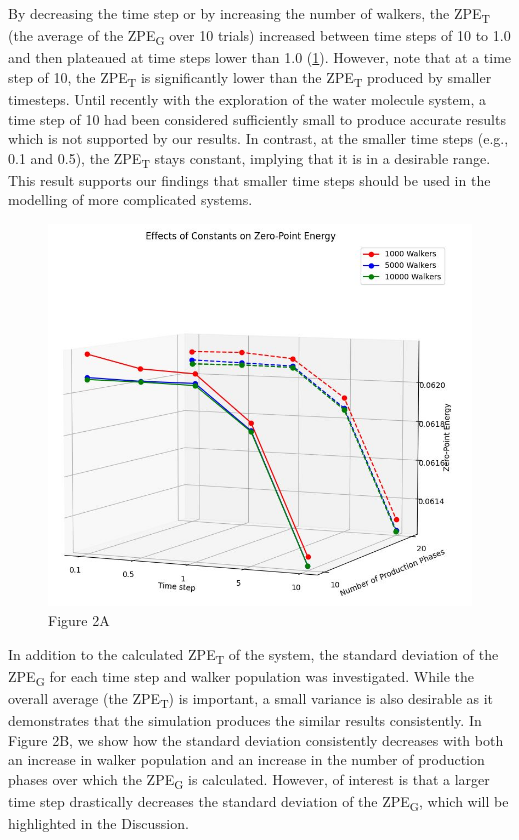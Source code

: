 \documentclass[journal=jacsat,manuscript=article]{achemso}
\begin{document}
By decreasing the time step or by increasing the number of walkers, the ZPE\textsubscript{T} (the average of the ZPE\textsubscript{G} over 10 trials) increased between time steps of 10 to 1.0 and then plateaued at time steps lower than 1.0 (\ref{fig:2A}). However, note that at a time step of 10, the ZPE\textsubscript{T} is significantly lower than the ZPE\textsubscript{T} produced by smaller timesteps. Until recently with the exploration of the water molecule system, a time step of 10 had been considered sufficiently small to produce accurate results which is not supported by our results. In contrast, at the smaller time steps (e.g., 0.1 and 0.5), the ZPE\textsubscript{T} stays constant, implying that it is in a desirable range. This result supports our findings that smaller time steps should be used in the modelling of more complicated systems. 

\begin{figure}
  \includegraphics[width=\linewidth]{fig_2A.jpg}
  \caption{Figure 2A}
  \label{fig:2A}
\end{figure}

In addition to the calculated ZPE\textsubscript{T} of the system, the standard deviation of the ZPE\textsubscript{G} for each time step and walker population was investigated. While the overall average (the ZPE\textsubscript{T}) is important, a small variance is also desirable as it demonstrates that the simulation produces the similar results consistently. In Figure 2B, we show how the standard deviation consistently decreases with both an increase in walker population and an increase in the number of production phases over which the ZPE\textsubscript{G} is calculated. However, of interest is that a larger time step drastically decreases the standard deviation of the ZPE\textsubscript{G}, which will be highlighted in the Discussion. 
\end{document}
